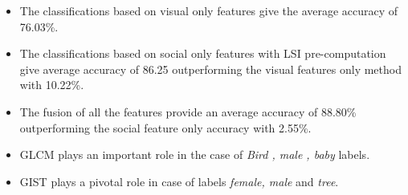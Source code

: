 \begin{itemize}
\item The classifications based on visual only features give the average accuracy of 76.03\%.

\item The classifications based on social only features with LSI pre-computation give average accuracy of 86.25 outperforming the visual features only method with 10.22\%.

\item The fusion of all the features provide an average accuracy of 88.80\% outperforming the social feature only accuracy with 2.55\%.


\item GLCM plays an important role in the case of \textit{Bird , male , baby}  labels.

\item GIST plays a pivotal role in case of labels \textit{female, male} and \textit{tree}.


\end{itemize}




\newpage

